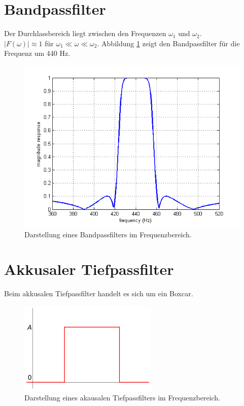 \section{Bandpassfilter}
Der Durchlassbereich liegt zwischen den Frequenzen $\omega_{1}$ und $\omega_{2}$. \\
$\vert F(\omega) \vert \approx 1 $ für $\omega_{1} \ll\omega \ll\omega_{2}$. Abbildung \ref{fig:filt_bandpass} zeigt den Bandpassfilter für die Frequenz um 440 Hz. 
\begin{figure}[h!]
\centering
\includegraphics[width=.4\tw]{fig/06-Filter/bandpass.png}
\caption{Darstellung eines Bandpassfilters im Frequenzbereich.}
\label{fig:filt_bandpass}
\end{figure}

\section{Akkusaler Tiefpassfilter}
Beim akkusalen Tiefpassfilter handelt es sich um ein Boxcar. 
\begin{figure}[h!]
\centering
\includegraphics[width=.6\tw]{fig/06-Filter/boxcar.png}
\caption{Darstellung eines akausalen Tiefpassfilters im Frequenzbereich.}
\end{figure}